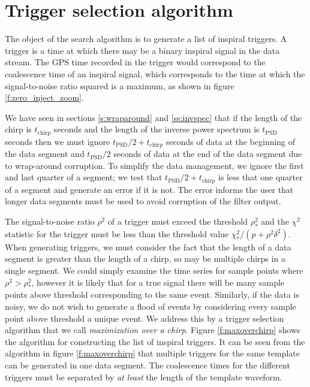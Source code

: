\section{Trigger selection algorithm}
\label{s:maxoverchirp}

The object of the search algorithm is to generate a list of inspiral triggers.
A trigger is a time at which there may be a binary inspiral signal in the data
stream. The GPS time recorded in the trigger would correspond to the
coalescence time of an inspiral signal, which corresponds to the time at which
the signal-to-noise ratio squared is a maximum, as shown in figure
\ref{f:zero_inject_zoom}.

We have seen in sections \ref{s:wraparound} and \ref{ss:invspec} that if the
length of the chirp is $t_\mathrm{chirp}$ seconds and the length of the
inverse power spectrum is $t_\mathrm{PSD}$ seconds then we must ignore
$t_\mathrm{PSD}/2 + t_\mathrm{chirp}$ seconds of data at the beginning of the
data segment and $t_\mathrm{PSD}/2$ seconds of data at the end of the data
segment due to wrap-around corruption. To simplify the data management, we
ignore the first and last quarter of a segment; we test that $t_\mathrm{PSD}/2
+ t_\mathrm{chirp}$ is less that one quarter of a segment and generate an
error if it is not. The error informs the user that longer
data segments must be used to avoid corruption of the filter output.

The signal-to-noise ratio $\rho^2$ of a trigger must exceed the threshold
$\rho^2_\ast$ and the $\chi^2$ statistic for the trigger must be less than the
threshold value $\chi^2_\ast/(p+\rho^2\delta^2)$.  When generating triggers,
we must consider the fact that the length of a data segment is greater than
the length of a chirp, so may be multiple chirps in a single segment.  We
could simply examine the time series for sample points where $\rho^2 >
\rho^2_\ast$, however it is likely that for a true signal there will be many
sample points above threshold corresponding to the same event.  Similarly, if
the data is noisy, we do not wish to generate a flood of events by considering
every sample point above threshold a unique event. We address this by a
trigger selection algorithm that we call \emph{maximization over a chirp}.
Figure \ref{f:maxoverchirp} shows the algorithm for constructing the list of
inspiral triggers.
It can be seen from the algorithm in figure \ref{f:maxoverchirp}  that
multiple triggers for the same template can be generated in one data segment.
The coalescence times for the different triggers must be separated by
\textit{at least} the length of the template waveform.  

